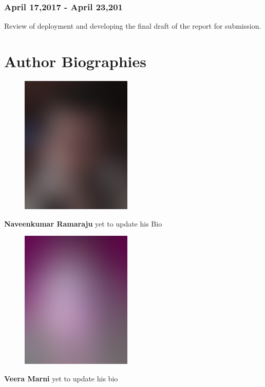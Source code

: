 \documentclass[9pt,twocolumn,twoside]{../../styles/osajnl}
\begin{document}
	\subsubsection{April 17,2017 - April 23,201}
	
	Review of deployment and developing the final draft of the report 
	for 
	submission.
	
	\section*{Author Biographies}
	\begingroup
	\setlength\intextsep{0pt}
	\begin{minipage}[t][3.2cm][t]{1.0\columnwidth} %
		\begin{figure}
			\includegraphics[width=0.25\columnwidth]{images/john_smith.eps}
		\end{figure}
		\noindent
		{\bfseries Naveenkumar Ramaraju} yet to update his 
		Bio\end{minipage}
	\begin{minipage}[t][3.2cm][t]{1.0\columnwidth} %
		\begin{figure}
			\includegraphics[width=0.25\columnwidth]{images/alice_smith.eps}
		\end{figure}
		\noindent
		{\bfseries Veera Marni} yet to update his bio
	\end{minipage}
	
	\endgroup
	
	\newpage
	
\end{document}
